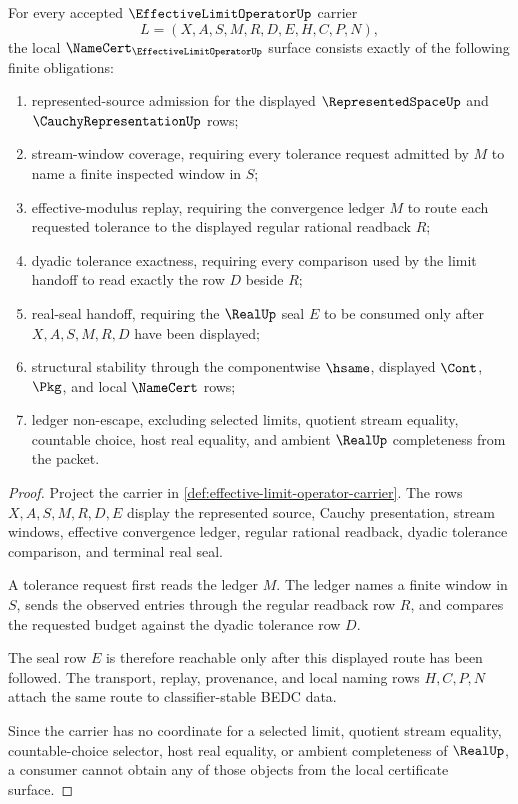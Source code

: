 \begin{theorem}
\label{thm:effective-limit-operator-namecert-obligations}
For every accepted $\EffectiveLimitOperatorUp$ carrier
$$
L=(X,A,S,M,R,D,E,H,C,P,N),
$$
the local $\NameCert_{\EffectiveLimitOperatorUp}$ surface consists exactly of the following finite obligations:
\begin{enumerate}
\item represented-source admission for the displayed $\RepresentedSpaceUp$ and $\CauchyRepresentationUp$ rows;
\item stream-window coverage, requiring every tolerance request admitted by $M$ to name a finite inspected window in $S$;
\item effective-modulus replay, requiring the convergence ledger $M$ to route each requested tolerance to the displayed regular rational readback $R$;
\item dyadic tolerance exactness, requiring every comparison used by the limit handoff to read exactly the row $D$ beside $R$;
\item real-seal handoff, requiring the $\RealUp$ seal $E$ to be consumed only after $X,A,S,M,R,D$ have been displayed;
\item structural stability through the componentwise $\hsame$, displayed $\Cont$, $\Pkg$, and local $\NameCert$ rows;
\item ledger non-escape, excluding selected limits, quotient stream equality, countable choice, host real equality, and ambient $\RealUp$ completeness from the packet.
\end{enumerate}
\end{theorem}
\begin{proof}
Project the carrier in \autoref{def:effective-limit-operator-carrier}. The rows $X,A,S,M,R,D,E$ display the represented source, Cauchy presentation, stream windows, effective convergence ledger, regular rational readback, dyadic tolerance comparison, and terminal real seal.

A tolerance request first reads the ledger $M$. The ledger names a finite window in $S$, sends the observed entries through the regular readback row $R$, and compares the requested budget against the dyadic tolerance row $D$.

The seal row $E$ is therefore reachable only after this displayed route has been followed. The transport, replay, provenance, and local naming rows $H,C,P,N$ attach the same route to classifier-stable BEDC data.

Since the carrier has no coordinate for a selected limit, quotient stream equality, countable-choice selector, host real equality, or ambient completeness of $\RealUp$, a consumer cannot obtain any of those objects from the local certificate surface.
\end{proof}

